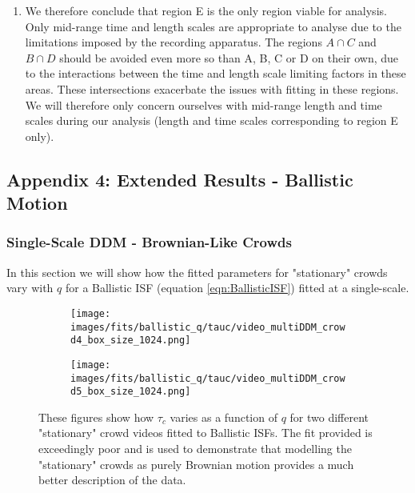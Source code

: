 \documentclass[10pt]{article}
\begin{document}
\begin{enumerate}[label=(\Alph*)]
\item We therefore conclude that region E is the only region viable for analysis. Only mid-range time and length scales are appropriate to analyse due to the limitations imposed by the recording apparatus. The regions $A \cap C$ and $B \cap D$ should be avoided even more so than A, B, C or D on their own, due to the interactions between the time and length scale limiting factors in these areas. These intersections exacerbate the issues with fitting in these regions. We will therefore only concern ourselves with mid-range length and time scales during our analysis (length and time scales corresponding to region E only).
\end{enumerate}

\subsection{Appendix 4: Extended Results - Ballistic Motion}
\label{section:ballistic_motion_results}

\subsubsection{Single-Scale DDM - Brownian-Like Crowds}
In this section we will show how the fitted parameters for "stationary" crowds vary with $q$ for a Ballistic ISF (equation \ref{eqn:BallisticISF}) fitted at a single-scale.

\begin{figure}[H]
\begin{subfigure}[t]{.5\textwidth}
  \centering
  \texttt{[image: images/fits/ballistic\_q/tauc/video\_multiDDM\_crowd4\_box\_size\_1024.png]}
  \caption{}
\end{subfigure}%
\hfill
\begin{subfigure}[t]{.5\textwidth}
  \centering
  \texttt{[image: images/fits/ballistic\_q/tauc/video\_multiDDM\_crowd5\_box\_size\_1024.png]}
  \caption{}
\end{subfigure}
\caption{These figures show how $\tau_c$ varies as a function of $q$ for two different "stationary" crowd videos fitted to Ballistic ISFs. The fit provided is exceedingly poor and is used to demonstrate that modelling the "stationary" crowds as purely Brownian motion provides a much better description of the data.}
\label{fig:crowd_ballistic_fits_tauc}
\end{figure}
\end{document}
